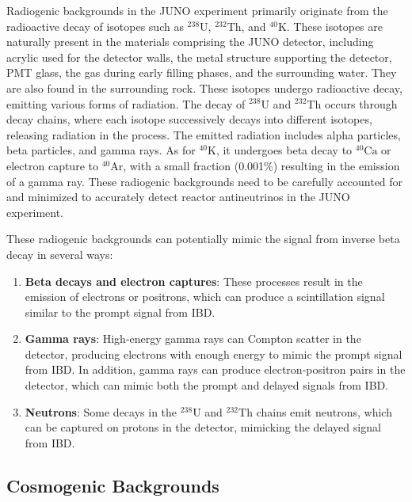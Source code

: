 Radiogenic backgrounds in the JUNO experiment primarily originate from the radioactive decay of isotopes such as $^{238}\mathrm{U}$, $^{232}\mathrm{Th}$, and $^{40}\mathrm{K}$. These isotopes are naturally present in the materials comprising the JUNO detector, including acrylic used for the detector walls, the metal structure supporting the detector, PMT glass, the gas during early filling phases, and the surrounding water. They are also found in the surrounding rock. These isotopes undergo radioactive decay, emitting various forms of radiation. The decay of $^{238}\mathrm{U}$ and $^{232}\mathrm{Th}$ occurs through decay chains, where each isotope successively decays into different isotopes, releasing radiation in the process. The emitted radiation includes alpha particles, beta particles, and gamma rays. As for $^{40}\mathrm{K}$, it undergoes beta decay to $^{40}\mathrm{Ca}$ or electron capture to $^{40}\mathrm{Ar}$, with a small fraction (0.001$\%$) resulting in the emission of a gamma ray. These radiogenic backgrounds need to be carefully accounted for and minimized to accurately detect reactor antineutrinos in the JUNO experiment.


These radiogenic backgrounds can potentially mimic the signal from inverse beta decay in several ways:

\begin{enumerate}
	\item \textbf{Beta decays and electron captures}: These processes result in the emission of electrons or positrons, which can produce a scintillation signal similar to the prompt signal from IBD.

	\item \textbf{Gamma rays}: High-energy gamma rays can Compton scatter in the detector, producing electrons with enough energy to mimic the prompt signal from IBD. In addition, gamma rays can produce electron-positron pairs in the detector, which can mimic both the prompt and delayed signals from IBD.
	
	\item \textbf{Neutrons}: Some decays in the $^{238}\mathrm{U}$ and $^{232}\mathrm{Th}$ chains emit neutrons, which can be captured on protons in the detector, mimicking the delayed signal from IBD.

\end{enumerate}

\subsection*{Cosmogenic Backgrounds}

